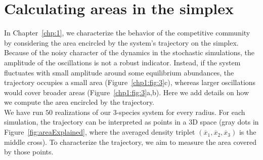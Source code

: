 \chapter{Calculating areas in the simplex}\label{appen:AreaSimplex}
In Chapter~\ref{chp:1}, we characterize the behavior of the competitive community by considering the area encircled by the system’s trajectory on the simplex. Because of the noisy character of the dynamics in the stochastic simulations, the amplitude of the oscillations is not a robust indicator. Instead, if the system fluctuates with small amplitude around some equilibrium abundances, the trajectory occupies a small area (Figure~\ref{chp1:fig:3}c), whereas larger oscillations would cover broader areas (Figure~\ref{chp1:fig:3}a,b). Here we add details on how we compute the area encircled by the trajectory.\\

We have run $50$ realizations of our $3$-species system for every radius. For each simulation, the trajectory can be interpreted as points in a 3D space (gray dots in Figure~\ref{fig:areaExplained}, where the averaged density triplet $(\overline{x}_1,\overline{x}_2,\overline{x}_3)$  is the middle cross). To characterize the trajectory, we aim to measure the area covered by those points. \\

